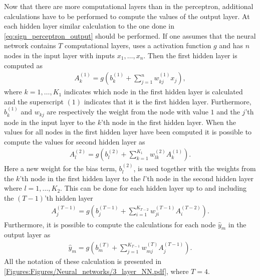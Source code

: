 Now that there are more computational layers than in the perceptron, additional calculations have to be performed to compute the values of the output layer. At each hidden layer similar calculation to the one done in \eqref{eq:sign_perceptron_output} should be performed. If one assumes that the neural network contains $T$ computational layers, uses a activation function $g$ and has $n$ nodes in the input layer with inputs $x_1,\ldots, x_n$. Then the first hidden layer is computed as
\begin{align*}
    A^{(1)}_k = g\left(b_{k}^{(1)} + \sum_{j=1}^n w_{kj}^{(1)}x_j\right),
\end{align*}
where $k = 1,\ldots,K_1$ indicates which node in the first hidden layer is calculated and the superscript $(1)$ indicates that it is the first hidden layer. Furthermore, $b_{k}^{(1)}$ and $w_{kj}$ are respectively the weight from the node with value $1$ and the $j$'th node in the input layer to the $k$'th node in the first hidden layer. When the values for all nodes in the first hidden layer have been computed it is possible to compute the values for second hidden layer as
\begin{align*}
    A^{(2)}_l = g\left(b_{l}^{(2)} + \sum_{k=1}^{K_1} w_{lk}^{(2)}A_k^{(1)}\right).
\end{align*}
Here a new weight for the bias term, $b_{l}^{(2)}$, is used together with the weights from the $k$'th node in the first hidden layer to the $l$'th node in the second hidden layer where $l = 1,\ldots, K_2$. This can be done for each hidden layer up to and including the $(T-1)$'th hidden layer
\begin{align*}
    A^{(T-1)}_j = g\left(b_{j}^{(T-1)} + \sum_{i=1}^{K_{T-2}} w_{ji}^{(T-1)}A_i^{(T-2)}\right).
\end{align*}
Furthermore, it is possible to compute the calculations for each node $\hat{y}_m$ in the output layer as
\begin{align*}
    \hat{y}_m = g\left(b_{m}^{(T)} + \sum_{j=1}^{K_{T-1}} w_{mj}^{(T)}A_j^{(T-1)}\right).
\end{align*}
All the notation of these calculation is presented in \autoref{Figures:Figures/Neural_networks/3_layer_NN.pdf}, where $T = 4$. %

